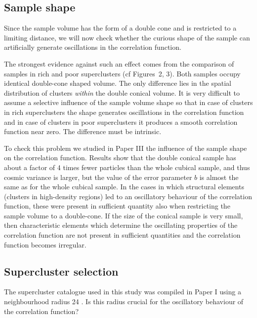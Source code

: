 \subsection{ Sample shape}

Since the sample volume has the form of a double cone and is restricted to a
limiting distance, we will now check whether the curious shape of the sample
can artificially generate oscillations in the correlation function.

The strongest evidence against such an effect comes from the
comparison of samples in rich and poor superclusters (cf Figures~2,
3).  Both samples occupy identical double-cone shaped volume. The only
difference lies in the spatial distribution of clusters {\it within}
the double conical volume.  It is very difficult to assume a selective
influence of the sample volume shape so that in case of clusters in
rich superclusters the shape generates oscillations in the correlation
function and in case of clusters in poor superclusters it produces a
smooth correlation function near zero. The difference must be
intrinsic.

To check this problem we studied in Paper III the influence of the sample
shape on the correlation function.  Results show that the double conical
sample has about a factor of 4 times fewer particles than the whole cubical
sample, and thus cosmic variance is larger, but the value of the error
parameter $b$ is almost the same as for the whole cubical sample. In the cases
in which structural elements (clusters in high-density regions) led to an
oscillatory behaviour of the correlation function, these were present in
sufficient quantity also when restricting the sample volume to a double-cone.
If the size of the conical sample is very small, then characteristic elements
which determine the oscillating properties of the correlation function are not
present in sufficient quantities and the correlation function becomes
irregular.


\subsection{ Supercluster selection}

The supercluster catalogue used in this study was compiled in Paper I using a
neighbourhood radius 24 \Mpc.  Is this radius crucial for the oscillatory
behaviour of the correlation function?


